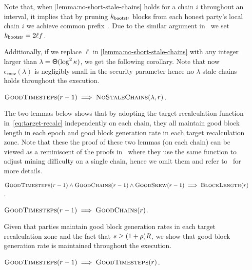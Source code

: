 Note that, when \cref{lemma:no-short-stale-chains} holds for a chain $i$ throughout an interval, it implies that by pruning $k_{\mathsf{bootstr}}$ blocks from each honest party's local chain $i$ we achieve common prefix~\cite{EC:GarKiaLeo15}.
%
Due to the similar argument in~\cite{EPRINT:GarKiaLeo20} we set $k_{\mathsf{bootstr}} = 2 \ell f$.

Additionally, if we replace $\ell$ in \cref{lemma:no-short-stale-chains} with any integer larger than $\lambda = \mathsf{\Theta}(\log^2 \kappa)$, we get the following corollary.
%
Note that now $\epsilon_{\mathsf{conv}}(\lambda)$ is negligibly small in the security parameter hence no $\lambda$-stale chains holds throughout the execution.

\begin{corollary} \label{corollary:no-long-stale-chains}
    $\textsc{GoodTimesteps}(r - 1) \implies \textsc{NoStaleChains}(\lambda, r)$.
\end{corollary}

The two lemmas below shows that by adopting the target recalculation function in~\cref{eq:target-recalc} independently on each chain, they all maintain good block length in each epoch and good block generation rate in each target recalculation zone.
%
Note that these the proof of these two lemmas (on each chain) can be viewed as a reminiscent of the proofs in~\cite{TCC:GarKiaShe22} where they use the same function to adjust mining difficulty on a single chain, hence we omit them and refer to~\cite{TCC:GarKiaShe22} for more details.

\begin{lemma} \label{lemma:good-block-length}
    $\textsc{GoodTimesteps}(r - 1) \wedge \textsc{GoodChains}(r - 1) \wedge \textsc{GoodSkew}(r - 1) \implies \textsc{BlockLength}(r)$.
\end{lemma}

\begin{lemma} \label{lemma:good-chains}
    $\textsc{GoodTimesteps}(r - 1) \implies \textsc{GoodChains}(r)$.
\end{lemma}

Given that parties maintain good block generation rates in each target recalculation zone and the fact that $s \ge (1 + \rho) R$, we show that good block generation rate is maintained throughout the execution.

\begin{corollary}
    $\textsc{GoodTimesteps}(r - 1) \implies \textsc{GoodTimesteps}(r)$.
\end{corollary}

